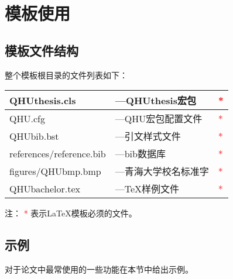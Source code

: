 
\chapter{模板使用}
\section{模板文件结构\label{sec:files}}
整个模板根目录的文件列表如下：
\begin{center}
\begin{tabular}{|l|l|l|}
\hline
QHUthesis.cls & ---QHUthesis宏包 & \textcolor{red}{{*}}\\
\hline
QHU.cfg & ---QHU宏包配置文件 & \textcolor{red}{{*}}\\
\hline
QHUbib.bst & ---引文样式文件 & \textcolor{red}{{*}}\\
\hline
references/reference.bib & ---bib数据库 & \textcolor{red}{{*}}\\
\hline
figures/QHUbmp.bmp & ---青海大学校名标准字 & \textcolor{red}{{*}}\\
\hline
QHUbachelor.tex & ---\TeX{}样例文件 &\textcolor{red}{{*}}\\
\hline
\end{tabular}
\end{center}
注： \textcolor{red}{{*}} 表示\LaTeX{}模板必须的文件。
\section{示例}
对于论文中最常使用的一些功能在本节中给出示例。

